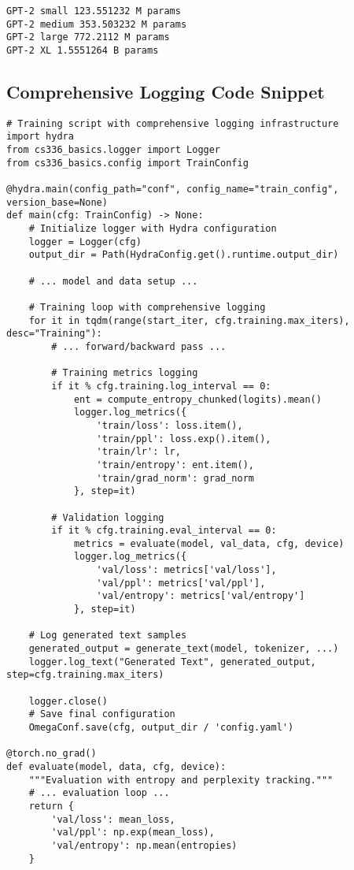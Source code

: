 \begin{lstlisting}
GPT-2 small 123.551232 M params
GPT-2 medium 353.503232 M params
GPT-2 large 772.2112 M params
GPT-2 XL 1.5551264 B params
\end{lstlisting}

\subsection{Comprehensive Logging Code Snippet}
\label{appendix:logging-code}

\begin{lstlisting}
# Training script with comprehensive logging infrastructure
import hydra
from cs336_basics.logger import Logger
from cs336_basics.config import TrainConfig

@hydra.main(config_path="conf", config_name="train_config", version_base=None)
def main(cfg: TrainConfig) -> None:
    # Initialize logger with Hydra configuration
    logger = Logger(cfg)
    output_dir = Path(HydraConfig.get().runtime.output_dir)
    
    # ... model and data setup ...
    
    # Training loop with comprehensive logging
    for it in tqdm(range(start_iter, cfg.training.max_iters), desc="Training"):
        # ... forward/backward pass ...
        
        # Training metrics logging
        if it % cfg.training.log_interval == 0:
            ent = compute_entropy_chunked(logits).mean()
            logger.log_metrics({
                'train/loss': loss.item(), 
                'train/ppl': loss.exp().item(),
                'train/lr': lr,
                'train/entropy': ent.item(),
                'train/grad_norm': grad_norm
            }, step=it)
            
        # Validation logging
        if it % cfg.training.eval_interval == 0:
            metrics = evaluate(model, val_data, cfg, device)
            logger.log_metrics({
                'val/loss': metrics['val/loss'],
                'val/ppl': metrics['val/ppl'], 
                'val/entropy': metrics['val/entropy']
            }, step=it)
    
    # Log generated text samples
    generated_output = generate_text(model, tokenizer, ...)
    logger.log_text("Generated Text", generated_output, step=cfg.training.max_iters)
    
    logger.close()
    # Save final configuration
    OmegaConf.save(cfg, output_dir / 'config.yaml')

@torch.no_grad()
def evaluate(model, data, cfg, device):
    """Evaluation with entropy and perplexity tracking."""
    # ... evaluation loop ...
    return {
        'val/loss': mean_loss,
        'val/ppl': np.exp(mean_loss),
        'val/entropy': np.mean(entropies)
    }
\end{lstlisting}